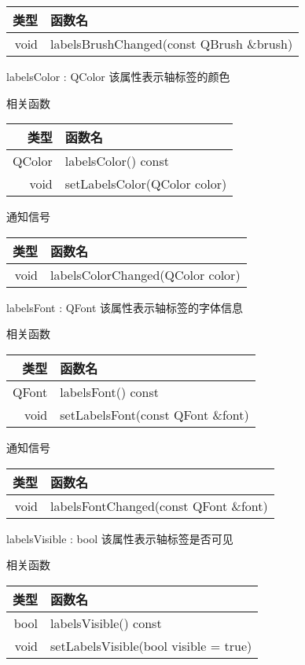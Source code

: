 \begin{tabular}{|r|l|}
\hline
类型&函数名\\ 
\hline
void &	labelsBrushChanged(const QBrush \&brush)\\
\hline
\end{tabular}

\splitLine

labelsColor : QColor 该属性表示轴标签的颜色

相关函数

\begin{tabular}{|r|l|}
\hline
类型&函数名\\ 
\hline
QColor	&labelsColor() const\\
\hline
void &setLabelsColor(QColor color)\\
\hline
\end{tabular}

通知信号

\begin{tabular}{|r|l|}
\hline
类型&函数名\\ 
\hline
void &	labelsColorChanged(QColor color)\\
\hline
\end{tabular}

\splitLine

labelsFont : QFont 该属性表示轴标签的字体信息

相关函数

\begin{tabular}{|r|l|}
\hline
类型&函数名\\ 
\hline
QFont	&labelsFont() const\\
\hline
void	&setLabelsFont(const QFont \&font)\\
\hline
\end{tabular}

通知信号

\begin{tabular}{|r|l|}
\hline
类型&函数名\\ 
\hline
void	&labelsFontChanged(const QFont \&font)\\
\hline
\end{tabular}

\splitLine

labelsVisible : bool 该属性表示轴标签是否可见

相关函数

\begin{tabular}{|r|l|}
\hline
类型&函数名\\ 
\hline
bool&	labelsVisible() const\\
\hline
void	&setLabelsVisible(bool visible = true)\\
\hline
\end{tabular}

